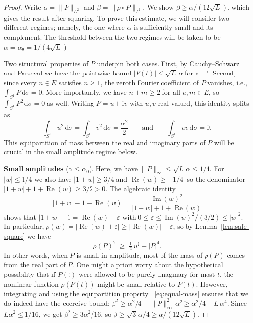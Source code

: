 \documentclass[11pt]{amsart}
\theoremstyle{remark}
\begin{document}
\begin{proof}
Write $\alpha = \lVert P \rVert_{L^2}$ and $\beta = \lVert \rho \circ P \rVert_{L^2}$.
We show $\beta \ge \alpha/(12\sqrt{L})$, which gives the result after
squaring. To prove this estimate, we will consider two different regimes; namely, the one where $\alpha$ is sufficiently small and its complement. The threshold between the two regimes will be taken to be
$\alpha=\alpha_0 = 1/(4\sqrt{L})$.
\medskip

Two structural properties of $P$ underpin both cases.  First,
by Cauchy--Schwarz and Parseval we have the pointwise bound
$\lvert P(t) \rvert \le \sqrt{L}\, \alpha$ for all~$t$.
Second, since every $n \in E$ satisfies $n \ge 1$, the zeroth Fourier
coefficient of $P$ vanishes, i.e.,
$\int_{S^1} P\,\mathrm{d}\sigma = 0$.
More importantly, we have $n + m \ge 2$ for all $n, m \in E$, so
$\int_{S^1} P^2\,\mathrm{d}\sigma = 0$ as well.  Writing $P = u + \mathrm{i} v$ with
$u, v$ real-valued, this identity splits as
\begin{equation}\label{eq:equal-mass}
\int_{S^1} u^2\,\mathrm{d}\sigma
= \int_{S^1} v^2\,\mathrm{d}\sigma
= \frac{\alpha^2}{2}
\qquad\text{and}\qquad
\int_{S^1} uv\,\mathrm{d}\sigma = 0.
\end{equation}
This equipartition of mass between the real and imaginary parts of $P$ will be crucial in the small amplitude regime below.
\medskip

\noindent
\textbf{Small amplitudes} ($\alpha \le \alpha_0$).
Here, we have $\lVert P \rVert_\infty \le \sqrt{L}\,\alpha \le 1/4$.  For $\lvert w \rvert \le 1/4$
we also have $\lvert 1+w \rvert \ge 3/4$ and $\operatorname{Re}(w) \ge -1/4$, so the denominator
$\lvert 1+w \rvert + 1 + \operatorname{Re}(w) \ge 3/2 > 0$.  The algebraic identity
\[
\lvert 1+w \rvert - 1 - \operatorname{Re}(w)
= \frac{\operatorname{Im}(w)^2}{\lvert 1+w \rvert + 1 + \operatorname{Re}(w)}
\]
shows that $\lvert 1+w \rvert - 1 = \operatorname{Re}(w) + \varepsilon$ with
$0 \le \varepsilon \le \operatorname{Im}(w)^2/(3/2) \le \lvert w \rvert^2$.  In particular,
$\rho(w) = \bigl\lvert \operatorname{Re}(w) + \varepsilon\bigr\rvert \ge
\lvert \operatorname{Re}(w) \rvert - \varepsilon$, so by 
Lemma~\ref{lem:safe-square} we have
\[
\rho(P)^2 \;\ge\; \tfrac{1}{2}\, u^2 - \lvert P \rvert^4.
\]
In other words, when $P$ is small in amplitude, most of the mass of $\rho(P)$ comes from the real part of $P$. One might a priori worry about the hypothetical possibility that if $P(t)$ were allowed to be purely imaginary for most $t$, the nonlinear function $\rho(P(t))$ might be small relative to $P(t)$. However, integrating and using the equipartition property ~\eqref{eq:equal-mass} ensures that we do indeed have the coercive bound:
$\beta^2 \ge \alpha^2/4 - \lVert P \rVert_\infty^2\, \alpha^2 \ge \alpha^2/4 - L\,\alpha^4$.
Since $L\alpha^2 \le 1/16$, we get $\beta^2 \ge 3\alpha^2/16$, so
$\beta \ge \sqrt{3}\,\alpha/4 \ge \alpha/(12\sqrt{L})$.


\end{proof}
\end{document}
